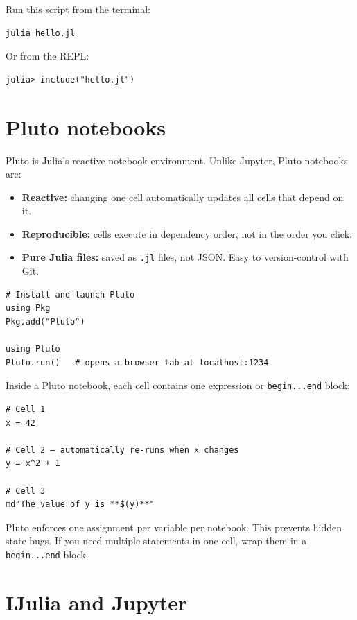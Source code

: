 Run this script from the terminal:
\begin{verbatim}
julia hello.jl
\end{verbatim}

Or from the REPL:
\begin{verbatim}
julia> include("hello.jl")
\end{verbatim}

\section{Pluto notebooks}

Pluto is Julia's reactive notebook environment. Unlike Jupyter, Pluto notebooks are:
\begin{itemize}
  \item \textbf{Reactive:} changing one cell automatically updates all cells that depend on it.
  \item \textbf{Reproducible:} cells execute in dependency order, not in the order you click.
  \item \textbf{Pure Julia files:} saved as \texttt{.jl} files, not JSON. Easy to version-control with Git.
\end{itemize}

\begin{verbatim}
# Install and launch Pluto
using Pkg
Pkg.add("Pluto")

using Pluto
Pluto.run()   # opens a browser tab at localhost:1234
\end{verbatim}

Inside a Pluto notebook, each cell contains one expression or \texttt{begin...end} block:

\begin{verbatim}
# Cell 1
x = 42

# Cell 2 — automatically re-runs when x changes
y = x^2 + 1

# Cell 3
md"The value of y is **$(y)**"
\end{verbatim}

\begin{juliatip}
Pluto enforces one assignment per variable per notebook. This prevents hidden state bugs. If you need multiple statements in one cell, wrap them in a \texttt{begin...end} block.
\end{juliatip}

\section{IJulia and Jupyter}

